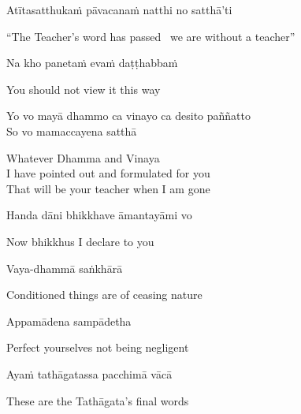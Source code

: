 Atītasatthukaṁ pāvacanaṁ natthi no satthā’ti

\begin{cprenglish}
  “The Teacher’s word has passed \breathmark\ we are without a teacher”
\end{cprenglish}

Na kho panetaṁ evaṁ daṭṭhabbaṁ

\begin{cprenglish}
  You should not view it this way
\end{cprenglish}

Yo vo mayā dhammo ca vinayo ca desito paññatto\\
So vo mamaccayena satthā

\begin{cprenglish}
  Whatever Dhamma and Vinaya\\
  I have pointed out and formulated for you\\
  That will be your teacher when I am gone
\end{cprenglish}

Handa dāni bhikkhave āmantayāmi vo

\begin{cprenglish}
  Now bhikkhus I declare to you
\end{cprenglish}

Vaya-dhammā saṅkhārā

\begin{cprenglish}
  Conditioned things are of ceasing nature
\end{cprenglish}

Appamādena sampādetha

\begin{cprenglish}
  Perfect yourselves not being negligent
\end{cprenglish}

Ayaṁ tathāgatassa pacchimā vācā

\begin{cprenglish}
  These are the Tathāgata’s final words
\end{cprenglish}

\suttaRef{[DN 16]}

\clearpage
